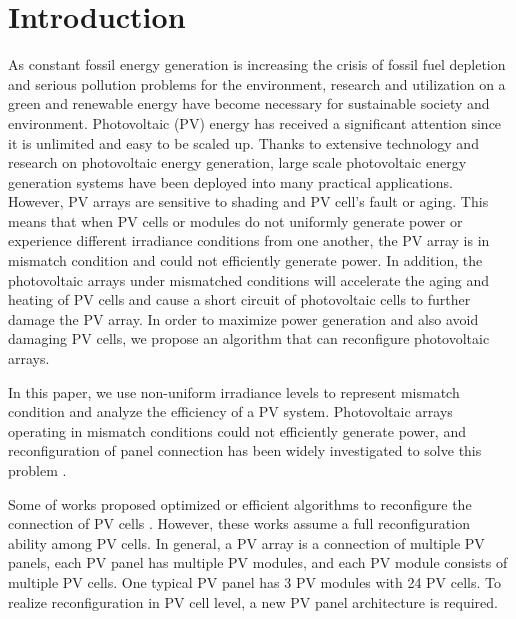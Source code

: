 \documentclass[conference]{IEEEtran}
\begin{document}
\section{Introduction} \label{intro}
As constant fossil energy generation is increasing the crisis of fossil fuel depletion and serious pollution problems for the environment, 
research and utilization on a green and renewable energy have become necessary for sustainable society and environment.
Photovoltaic (PV) energy has received a significant attention since it is unlimited and easy to be scaled up. Thanks to extensive technology and research on photovoltaic energy generation, large scale photovoltaic energy generation systems have been deployed into many practical applications. However, PV arrays are sensitive to shading and PV cell's fault or aging. This means that when 
PV cells or modules do not uniformly generate power
 or experience different irradiance conditions from one another, the PV array is in mismatch condition and could not efficiently generate power. In addition, the photovoltaic arrays under mismatched conditions will accelerate the aging and heating of PV cells and cause a short circuit of photovoltaic cells to further damage the PV array. In order to maximize power generation and also avoid damaging PV cells, we propose an algorithm that can reconfigure photovoltaic arrays.
 
In this paper, we use non-uniform irradiance levels to represent mismatch condition and analyze the efficiency of a PV system.
Photovoltaic arrays operating in mismatch conditions could not efficiently generate power, and reconfiguration of  panel connection has been widely investigated to solve this problem \cite{b2}.

Some of works proposed optimized or efficient algorithms to reconfigure the connection of PV cells \cite{b3}\cite{b4}. However, these works assume a full reconfiguration ability among PV cells. In general, a PV array is a connection of multiple PV panels, each PV panel has multiple PV modules, and each PV module consists of multiple PV cells. One typical PV panel has 3 PV modules with 24 PV cells. To realize reconfiguration in PV cell level, a new PV panel architecture is required.
\end{document}
